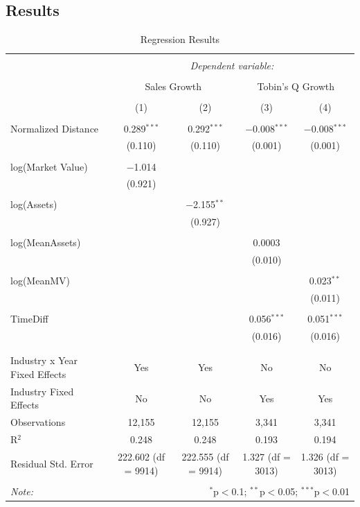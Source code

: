 \documentclass[
]{article}
\begin{document}
\subsection{Results}\label{results}

\begin{table}[!htbp] \centering 
  \caption{Regression Results} 
  \label{} 
\begin{tabular}{@{\extracolsep{5pt}}lcccc} 
\\[-1.8ex]\hline 
\hline \\[-1.8ex] 
 & \multicolumn{4}{c}{\textit{Dependent variable:}} \\ 
\cline{2-5} 
\\[-1.8ex] & \multicolumn{2}{c}{Sales Growth} & \multicolumn{2}{c}{Tobin's Q Growth} \\ 
\\[-1.8ex] & (1) & (2) & (3) & (4)\\ 
\hline \\[-1.8ex] 
 Normalized Distance & 0.289$^{***}$ & 0.292$^{***}$ & $-$0.008$^{***}$ & $-$0.008$^{***}$ \\ 
  & (0.110) & (0.110) & (0.001) & (0.001) \\ 
  & & & & \\ 
 log(Market Value) & $-$1.014 &  &  &  \\ 
  & (0.921) &  &  &  \\ 
  & & & & \\ 
 log(Assets) &  & $-$2.155$^{**}$ &  &  \\ 
  &  & (0.927) &  &  \\ 
  & & & & \\ 
 log(MeanAssets) &  &  & 0.0003 &  \\ 
  &  &  & (0.010) &  \\ 
  & & & & \\ 
 log(MeanMV) &  &  &  & 0.023$^{**}$ \\ 
  &  &  &  & (0.011) \\ 
  & & & & \\ 
 TimeDiff &  &  & 0.056$^{***}$ & 0.051$^{***}$ \\ 
  &  &  & (0.016) & (0.016) \\ 
  & & & & \\ 
\hline \\[-1.8ex] 
Industry x Year Fixed Effects & Yes & Yes & No & No \\ 
Industry Fixed Effects & No & No & Yes & Yes \\ 
Observations & 12,155 & 12,155 & 3,341 & 3,341 \\ 
R$^{2}$ & 0.248 & 0.248 & 0.193 & 0.194 \\ 
Residual Std. Error & 222.602 (df = 9914) & 222.555 (df = 9914) & 1.327 (df = 3013) & 1.326 (df = 3013) \\ 
\hline 
\hline \\[-1.8ex] 
\textit{Note:}  & \multicolumn{4}{r}{$^{*}$p$<$0.1; $^{**}$p$<$0.05; $^{***}$p$<$0.01} \\ 
\end{tabular} 
\end{table}
\end{document}
